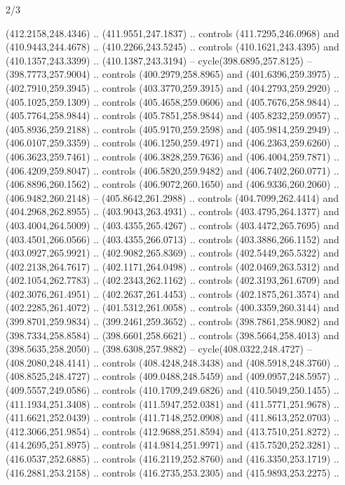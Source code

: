 \begin{flagdescription}{2/3}
\begin{scope}[xshift=0.5\flaglength,yshift=0.5\flagwidth,scale=\flagwidth/495.65]
\begin{scope}[y=0.8pt, x=0.8pt, yscale=-1,shift={(-463.76,-309.78)}]
  (412.2158,248.4346) .. (411.9551,247.1837) .. controls (411.7295,246.0968) and
  (410.9443,244.4678) .. (410.2266,243.5245) .. controls (410.1621,243.4395) and
  (410.1357,243.3399) .. (410.1387,243.3194) -- cycle(398.6895,257.8125) --
  (398.7773,257.9004) .. controls (400.2979,258.8965) and (401.6396,259.3975) ..
  (402.7910,259.3945) .. controls (403.3770,259.3915) and (404.2793,259.2920) ..
  (405.1025,259.1309) .. controls (405.4658,259.0606) and (405.7676,258.9844) ..
  (405.7764,258.9844) .. controls (405.7851,258.9844) and (405.8232,259.0957) ..
  (405.8936,259.2188) .. controls (405.9170,259.2598) and (405.9814,259.2949) ..
  (406.0107,259.3359) .. controls (406.1250,259.4971) and (406.2363,259.6260) ..
  (406.3623,259.7461) .. controls (406.3828,259.7636) and (406.4004,259.7871) ..
  (406.4209,259.8047) .. controls (406.5820,259.9482) and (406.7402,260.0771) ..
  (406.8896,260.1562) .. controls (406.9072,260.1650) and (406.9336,260.2060) ..
  (406.9482,260.2148) -- (405.8642,261.2988) .. controls (404.7099,262.4414) and
  (404.2968,262.8955) .. (403.9043,263.4931) .. controls (403.4795,264.1377) and
  (403.4004,264.5009) .. (403.4355,265.4267) .. controls (403.4472,265.7695) and
  (403.4501,266.0566) .. (403.4355,266.0713) .. controls (403.3886,266.1152) and
  (403.0927,265.9921) .. (402.9082,265.8369) .. controls (402.5449,265.5322) and
  (402.2138,264.7617) .. (402.1171,264.0498) .. controls (402.0469,263.5312) and
  (402.1054,262.7783) .. (402.2343,262.1162) .. controls (402.3193,261.6709) and
  (402.3076,261.4951) .. (402.2637,261.4453) .. controls (402.1875,261.3574) and
  (402.2285,261.4072) .. (401.5312,261.0058) .. controls (400.3359,260.3144) and
  (399.8701,259.9834) .. (399.2461,259.3652) .. controls (398.7861,258.9082) and
  (398.7334,258.8584) .. (398.6601,258.6621) .. controls (398.5664,258.4013) and
  (398.5635,258.2050) .. (398.6308,257.9882) -- cycle(408.0322,248.4727) --
  (408.2080,248.4141) .. controls (408.4248,248.3438) and (408.5918,248.3760) ..
  (408.8525,248.4727) .. controls (409.0488,248.5459) and (409.0957,248.5957) ..
  (409.5557,249.0586) .. controls (410.1709,249.6826) and (410.5049,250.1455) ..
  (411.1934,251.3408) .. controls (411.5947,252.0381) and (411.5771,251.9678) ..
  (411.6621,252.0439) .. controls (411.7148,252.0908) and (411.8613,252.0703) ..
  (412.3066,251.9854) .. controls (412.9688,251.8594) and (413.7510,251.8272) ..
  (414.2695,251.8975) .. controls (414.9814,251.9971) and (415.7520,252.3281) ..
  (416.0537,252.6885) .. controls (416.2119,252.8760) and (416.3350,253.1719) ..
  (416.2881,253.2158) .. controls (416.2735,253.2305) and (415.9893,253.2275) ..

\end{scope}
\end{scope}
\end{flagdescription}
